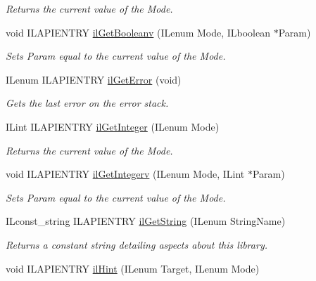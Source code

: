 \begin{DoxyCompactItemize}
\begin{DoxyCompactList}\small\item\em Returns the current value of the {\itshape Mode}. \end{DoxyCompactList}\item 
\hypertarget{group__state_ga4f52565d3e790d84e8a42b143446383e}{void I\-L\-A\-P\-I\-E\-N\-T\-R\-Y \hyperlink{group__state_ga4f52565d3e790d84e8a42b143446383e}{il\-Get\-Booleanv} (I\-Lenum Mode, I\-Lboolean $\ast$Param)}\label{group__state_ga4f52565d3e790d84e8a42b143446383e}

\begin{DoxyCompactList}\small\item\em Sets {\itshape Param} equal to the current value of the {\itshape Mode}. \end{DoxyCompactList}\item 
I\-Lenum I\-L\-A\-P\-I\-E\-N\-T\-R\-Y \hyperlink{group__state_ga6a4486f21a6ee2812033aeda6c4b320e}{il\-Get\-Error} (void)
\begin{DoxyCompactList}\small\item\em Gets the last error on the error stack. \end{DoxyCompactList}\item 
I\-Lint I\-L\-A\-P\-I\-E\-N\-T\-R\-Y \hyperlink{group__state_gac4d450b2397f016bbe00b0a0e4b53a0c}{il\-Get\-Integer} (I\-Lenum Mode)
\begin{DoxyCompactList}\small\item\em Returns the current value of the {\itshape Mode}. \end{DoxyCompactList}\item 
void I\-L\-A\-P\-I\-E\-N\-T\-R\-Y \hyperlink{group__state_ga4ed72709140871f480987a8c043ca4b8}{il\-Get\-Integerv} (I\-Lenum Mode, I\-Lint $\ast$Param)
\begin{DoxyCompactList}\small\item\em Sets {\itshape Param} equal to the current value of the {\itshape Mode}. \end{DoxyCompactList}\item 
I\-Lconst\-\_\-string I\-L\-A\-P\-I\-E\-N\-T\-R\-Y \hyperlink{group__state_ga29fd50e44b7e69435d64f82613438e4f}{il\-Get\-String} (I\-Lenum String\-Name)
\begin{DoxyCompactList}\small\item\em Returns a constant string detailing aspects about this library. \end{DoxyCompactList}\item 
void I\-L\-A\-P\-I\-E\-N\-T\-R\-Y \hyperlink{group__state_gad6f73e9f63ca905c29637f07e54cc604}{il\-Hint} (I\-Lenum Target, I\-Lenum Mode)

\end{DoxyCompactItemize}
